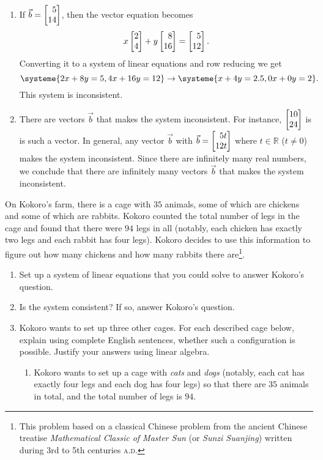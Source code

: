 \begin{exercises}
\begin{problist}
\begin{solution}
\begin{enumerate}
				\item If $\vec b=\mat{5 \\ 14}$, then the vector equation
					becomes
					\[
						x\mat{2 \\ 4}+y\mat{8 \\ 16}=\mat{5 \\ 12}.
					\]
					Converting it to a system of linear equations and row
					reducing we get
					\[
						\systeme{2x+8y=5,4x+16y=12}\rightarrow \systeme{x+4y=2.5, 0x+0y=2}.
					\]
					This system is inconsistent.

				\item There are vectors $\vec b$ that makes the system inconsistent.
					For instance, $\mat{10 \\ 24}$ is is such a vector. In
					general, any vector $\vec b$ with $\vec b=\mat{5t \\ 12t}$ where
					$t\in\mathbb{R}$ ($t\ne 0$) makes the system inconsistent.
					Since there are infinitely many real numbers, we conclude that
					there are infinitely many vectors $\vec b$ that makes the system
					inconsistent.
			\end{enumerate}
		\end{solution}

		\prob On Kokoro's farm, there is a cage with $35$ animals, some of which
		are chickens and some of which are rabbits. Kokoro counted the total
		number of legs in the cage and found that there were $94$ legs in all (notably,
		each chicken has exactly two legs and each rabbit has four legs). Kokoro
		decides to use this information to figure out how many chickens and how
		many rabbits there are\footnote{ This problem based on a classical
		Chinese problem from the ancient Chinese treatise \emph{Mathematical
		Classic of Master Sun} (or \emph{Sunzi Suanjing}) written during 3rd to
		5th centuries \textsc{a.d.}}.

		\begin{enumerate}
			\item Set up a system of linear equations that you could solve to answer
				Kokoro's question.

			\item Is the system consistent? If so, answer Kokoro's question.

			\item Kokoro wants to set up three other cages. For each described
				cage below, explain using complete English sentences, whether
				such a configuration is possible. Justify your answers using linear
				algebra.
				\begin{enumerate}
					\item Kokoro wants to set up a cage with \emph{cats} and
						\emph{dogs} (notably, each cat has exactly four legs and
						each dog has four legs) so that there are $35$ animals
						in total, and the total number of legs is $94$.


\end{enumerate}
\end{enumerate}
\end{problist}
\end{exercises}
